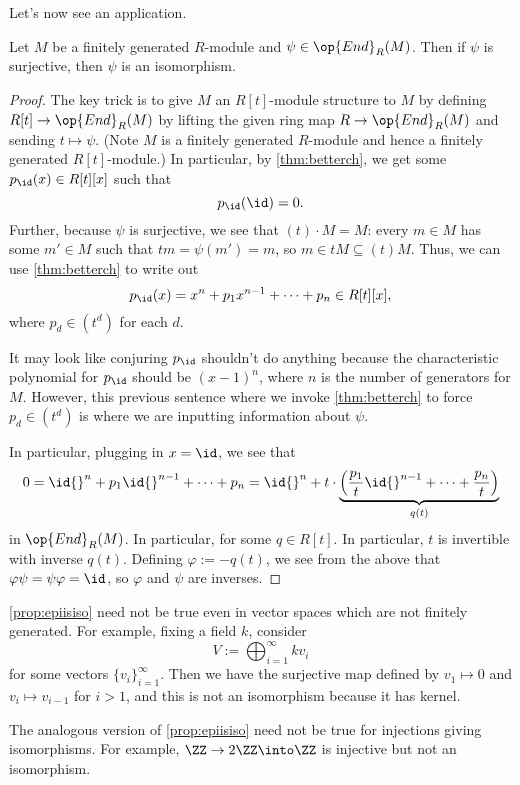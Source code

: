 Let's now see an application.
\begin{proposition} \label{prop:epiisiso}
	Let $M$ be a finitely generated $R$-module and $\psi\in\op{End}_R(M)$. Then if $\psi$ is surjective, then $\psi$ is an isomorphism.
\end{proposition}
\begin{proof}
	The key trick is to give $M$ an $R[t]$-module structure to $M$ by defining $R[t]\to\op{End}_R(M)$ by lifting the given ring map $R\to\op{End}_R(M)$ and sending $t\mapsto\psi$. (Note $M$ is a finitely generated $R$-module and hence a finitely generated $R[t]$-module.) In particular, by \autoref{thm:betterch}, we get some $p_{\id}(x)\in R[t][x]$ such that
	\[p_{\id}({\id})=0.\]
	Further, because $\psi$ is surjective, we see that $(t)\cdot M=M$: every $m\in M$ has some $m'\in M$ such that $tm=\psi(m')=m$, so $m\in tM\subseteq(t)M$. Thus, we can use \autoref{thm:betterch} to write out
	\[p_{\id}(x)=x^n+p_1x^{n-1}+\cdots+p_n\in R[t][x],\]
	where $p_d\in\left(t^d\right)$ for each $d$.
	\begin{remark}[Nir]
		It may look like conjuring $p_{\id}$ shouldn't do anything because the characteristic polynomial for $p_{\id}$ should be $(x-1)^n$, where $n$ is the number of generators for $M$. However, this previous sentence where we invoke \autoref{thm:betterch} to force $p_d\in\left(t^d\right)$ is where we are inputting information about $\psi$.
	\end{remark}
	In particular, plugging in $x=\id$, we see that
	\[0=\id{}^n+p_1\id{}^{n-1}+\cdots+p_n=\id{}^n+t\cdot\underbrace{\left(\frac{p_1}t\id{}^{n-1}+\cdots+\frac{p_n}t\right)}_{q(t)}\]
	in $\op{End}_R(M)$. In particular, for some $q\in R[t]$. In particular, $t$ is invertible with inverse $q(t)$. Defining $\varphi:=-q(t)$, we see from the above that $\varphi\psi=\psi\varphi=\id$, so $\varphi$ and $\psi$ are inverses.
\end{proof}
\begin{remark}
	\autoref{prop:epiisiso} need not be true even in vector spaces which are not finitely generated. For example, fixing a field $k$, consider
	\[V:=\bigoplus_{i=1}^\infty kv_i\]
	for some vectors $\{v_i\}_{i=1}^\infty$. Then we have the surjective map defined by $v_1\mapsto0$ and $v_i\mapsto v_{i-1}$ for $i>1$, and this is not an isomorphism because it has kernel.
\end{remark}
\begin{remark}
	The analogous version of \autoref{prop:epiisiso} need not be true for injections giving isomorphisms. For example, $\ZZ\to2\ZZ\into\ZZ$ is injective but not an isomorphism.
\end{remark}
